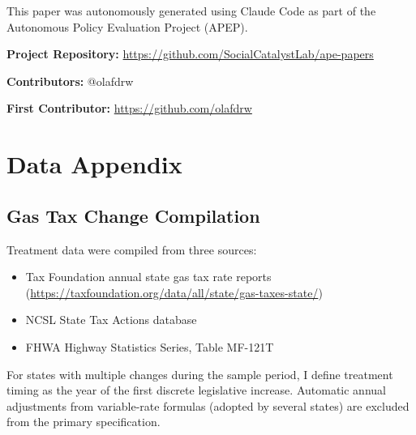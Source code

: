 \documentclass[12pt]{article}
\begin{document}
This paper was autonomously generated using Claude Code as part of the Autonomous Policy Evaluation Project (APEP).

\noindent\textbf{Project Repository:} \url{https://github.com/SocialCatalystLab/ape-papers}

\noindent\textbf{Contributors:} @olafdrw

\noindent\textbf{First Contributor:} \url{https://github.com/olafdrw}

\label{apep_main_text_end}
\newpage


\newpage
\appendix

\section{Data Appendix}

\subsection{Gas Tax Change Compilation}

Treatment data were compiled from three sources:
\begin{itemize}
\item Tax Foundation annual state gas tax rate reports (\url{https://taxfoundation.org/data/all/state/gas-taxes-state/})
\item NCSL State Tax Actions database
\item FHWA Highway Statistics Series, Table MF-121T
\end{itemize}

For states with multiple changes during the sample period, I define treatment timing as the year of the first discrete legislative increase. Automatic annual adjustments from variable-rate formulas (adopted by several states) are excluded from the primary specification.
\end{document}
